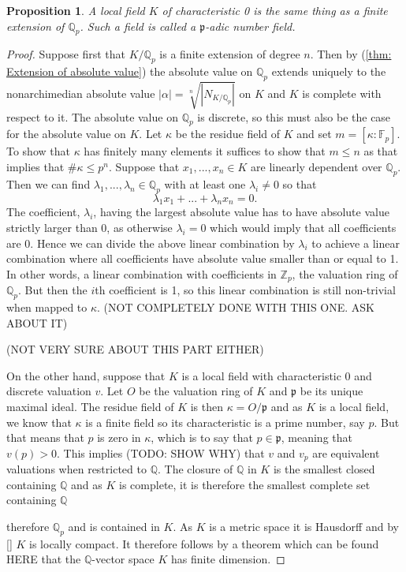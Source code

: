 \documentclass{article}
\newtheorem{proposition}{Proposition}[section]
\newcommand{\mfrak}[1]{\mathfrak{#1}}
\newcommand{\mbb}[1]{\mathbb{#1}}
\begin{document}
\begin{proposition}\label{prop: Characterization of local fields}
    A local field $K$ of characteristic 0 is the same thing as a finite extension of $\mbb Q_p$. Such a field is called a $\mfrak p$-adic number field. 
\end{proposition}
\begin{proof}
    Suppose first that $K /\mbb Q_p$ is a finite extension of degree $n$. Then by (\ref{thm: Extension of absolute value}) the absolute value on $\mbb Q_p$ extends uniquely to the nonarchimedian absolute value $|\alpha| = \sqrt[n]{|N_{K/\mbb Q_p}|}$ on $K$ and $K$ is complete with respect to it. The absolute value on $\mbb Q_p$ is discrete, so this must also be the case for the absolute value on $K$. Let $\kappa$ be the residue field of $K$ and set $m = [\kappa : \mbb F_p]$. To show that $\kappa$ has finitely many elements it suffices to show that $m \leq n$ as that implies that $\# \kappa \leq p^n$. Suppose that $x_1, ..., x_n \in K$ are linearly dependent over $\mbb Q_p$. Then we can find $\lambda_1, ..., \lambda_n \in \mbb Q_p$ with at least one $\lambda_i \neq 0$ so that 
    $$\lambda_1 x_1 + ... + \lambda_n x_n = 0.$$ 
    The coefficient, $\lambda_i$, having the largest absolute value has to have absolute value strictly larger than 0, as otherwise $\lambda_i = 0$ which would imply that all coefficients are 0. Hence we can divide the above linear combination by $\lambda_i$ to achieve a linear combination where all coefficients have absolute value smaller than or equal to 1. In other words, a linear combination with coefficients in $\mbb Z_p$, the valuation ring of $\mbb Q_p$. But then the $i$th coefficient is 1, so this linear combination is still non-trivial when mapped to $\kappa$. (NOT COMPLETELY DONE WITH THIS ONE. ASK ABOUT IT)


    (NOT VERY SURE ABOUT THIS PART EITHER)

    On the other hand, suppose that $K$ is a local field with characteristic 0 and discrete valuation $v$. Let $O$ be the valuation ring of $K$ and $\mfrak p$ be its unique maximal ideal. The residue field of $K$ is then $\kappa = O / \mfrak p$ and as $K$ is a local field, we know that $\kappa$ is a finite field so its characteristic is a prime number, say $p$. But that means that $p$ is zero in $\kappa$, which is to say that $p \in \mfrak p$, meaning that $v(p) > 0$.  This implies (TODO: SHOW WHY) that $v$ and $v_p$ are equivalent valuations when restricted to $\mbb Q$. The closure of $\mbb Q$ in $K$ is the smallest closed containing $\mbb Q$ and as $K$ is complete, it is therefore the smallest complete set containing $\mbb Q$   
    
    therefore $\mbb Q_p$ and is contained in $K$. As $K$ is a metric space it is Hausdorff and by \ref{} $K$ is locally compact. It therefore follows by a theorem which can be found HERE that the $\mbb Q$-vector space $K$ has finite dimension. 
\end{proof}
\end{document}
